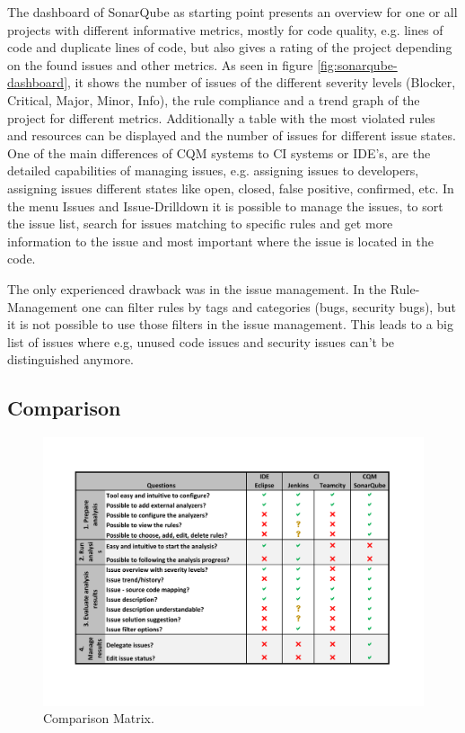 \documentclass[conference]{IEEEtran}
\begin{document}
The dashboard of SonarQube as starting point presents an overview for one or all projects with different informative metrics, mostly for code quality, e.g. lines of code and duplicate lines of code, but also gives a rating of the project depending on the found issues and other metrics.
As seen in figure \ref{fig:sonarqube-dashboard}, it shows the number of issues of the different severity levels (Blocker, Critical, Major, Minor, Info), the rule compliance and a trend graph of the project for different metrics.
Additionally a table with the most violated rules and resources can be displayed and the number of issues for different issue states.
One of the main differences of CQM systems to CI systems or IDE's, are the detailed capabilities of managing issues, e.g. assigning issues to developers, assigning issues different states like open, closed, false positive, confirmed, etc. 
In the menu Issues and Issue-Drilldown it is possible to manage the issues, to sort the issue list, search for issues matching to specific rules and get more information to the issue and most important where the issue is located in the code.


The only experienced drawback was in the issue management.
In the Rule-Management one can filter rules by tags and categories (bugs, security bugs), but it is not possible to use those filters in the issue management. 
This leads to a big list of issues where e.g, unused code issues and security issues can't be distinguished anymore.



\subsection{Comparison}
\label{subsec:comparation}

\begin{figure}[t]
	\includegraphics[width=\textwidth]{img/comparation}
	\caption{Comparison Matrix.}
	\label{fig:comparison_matrix}
\end{figure}
\end{document}
